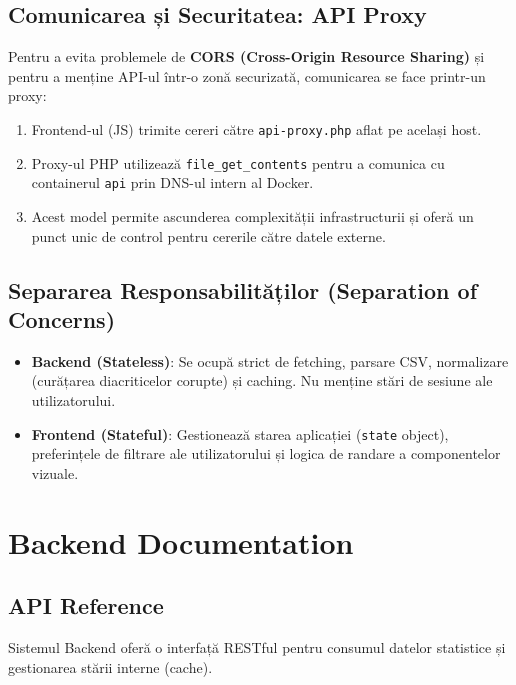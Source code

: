 \documentclass[12pt,a4paper]{article}
\begin{document}
\subsection{Comunicarea și Securitatea: API Proxy}
Pentru a evita problemele de \textbf{CORS (Cross-Origin Resource Sharing)} și pentru a menține API-ul într-o zonă securizată, comunicarea se face printr-un proxy:
\begin{enumerate}
    \item Frontend-ul (JS) trimite cereri către \texttt{api-proxy.php} aflat pe același host.
    \item Proxy-ul PHP utilizează \texttt{file\_get\_contents} pentru a comunica cu containerul \texttt{api} prin DNS-ul intern al Docker.
    \item Acest model permite ascunderea complexității infrastructurii și oferă un punct unic de control pentru cererile către datele externe.
\end{enumerate}

\subsection{Separarea Responsabilităților (Separation of Concerns)}
\begin{itemize}
    \item \textbf{Backend (Stateless)}: Se ocupă strict de fetching, parsare CSV, normalizare (curățarea diacriticelor corupte) și caching. Nu menține stări de sesiune ale utilizatorului.
    \item \textbf{Frontend (Stateful)}: Gestionează starea aplicației (\texttt{state} object), preferințele de filtrare ale utilizatorului și logica de randare a componentelor vizuale.
\end{itemize}

\section{Backend Documentation}

\subsection{API Reference}
Sistemul Backend oferă o interfață RESTful pentru consumul datelor statistice și gestionarea stării interne (cache).
\end{document}
